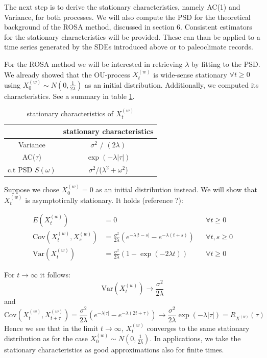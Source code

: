 \documentclass[%
thesis=student,%
coverpage=false,%
titlepage=false,%
headmarks=true, %
english,%
font=libertine, %
math=newpxtx, %
BCOR=5mm,%
coverBCOR=11mm%
]{tumbook}
\begin{document}
The next step is to derive the stationary characteristics, namely AC(1) and Variance, for both processes. We will also compute the PSD for the theoretical background of the ROSA method, discussed in section 6. Consistent estimators for the stationary characteristics will be provided. These can than be applied to a time series generated by the SDEs introduced above or to paleoclimate records. 

For the ROSA method we will be interested in retrieving $\lambda$ by fitting to the PSD. We already showed that the OU-process $X_{t}^{(w)}$ is wide-sense stationary $\forall t \geq 0$ using $X_{0}^{(w)} \sim N(0,\frac{1}{2\lambda})$ as an initial distribution. Additionally, we computed its characteristics. See a summary in table \ref{tab:white_noise_stat_char}. 


\begin{table}[t]
\centering
\begin{tabular}{|c|c|}
\hline
& stationary characteristics\\
\hline
Variance & $\sigma^2$ / $(2\lambda)$\\
AC($\tau$) & $\exp(-\lambda |\tau|)$\\
c.t PSD $S(\omega)$ & $\sigma^2$/($\lambda^2 + \omega^2$)\\
\hline
\end{tabular}
\caption{stationary characteristics of $X_{t}^{(w)}$}
\label{tab:white_noise_stat_char}
\end{table}

Suppose we chose $X_{0}^{(w)} = 0$ as an initial distribution instead. We will show that $X_{t}^{(w)}$ is asymptotically stationary. It holds (reference  ?):

 \begin{align*}
    E(X_{t}^{(w)}) &= 0   && \forall t \geq 0 \\
    \text{Cov}(X_{t}^{(w)},X_{s}^{(w)}) &= \frac{\sigma ^2}{2\lambda}(e^{-\lambda\lvert t-s \rvert}-e^{-\lambda(t+s)}) && \forall t, s \geq 0 \\
    \text{Var}(X_{t}^{(w)}) &= \frac{\sigma^2}{2\lambda}(1-\exp(-2\lambda t)) && \forall t \geq 0 
\end{align*}

For $t\rightarrow \infty$ it follows: 
\[
\text{Var}(X_{t}^{(w)})\rightarrow\frac{\sigma^2}{2\lambda}
\]
and 
\[
\text{Cov}(X_{t}^{(w)},X_{t+\tau}^{(w)}) = \frac{\sigma^2}{2\lambda}(e^{-\lambda\lvert \tau \rvert} - e^{-\lambda(2t + \tau)}) \rightarrow \frac{\sigma ^2}{2\lambda}\exp(-\lambda\lvert \tau \rvert) = R_{X^{(w)}}(\tau)
\]
Hence we see that in the limit $t\rightarrow \infty$, $X_{t}^{(w)}$ converges to the same stationary distribution as for the case $X_{0}^{(w)} \sim N(0,\frac{1}{2\lambda})$. 
In applications, we take the stationary characteristics as good approximations also for finite times.
\end{document}
